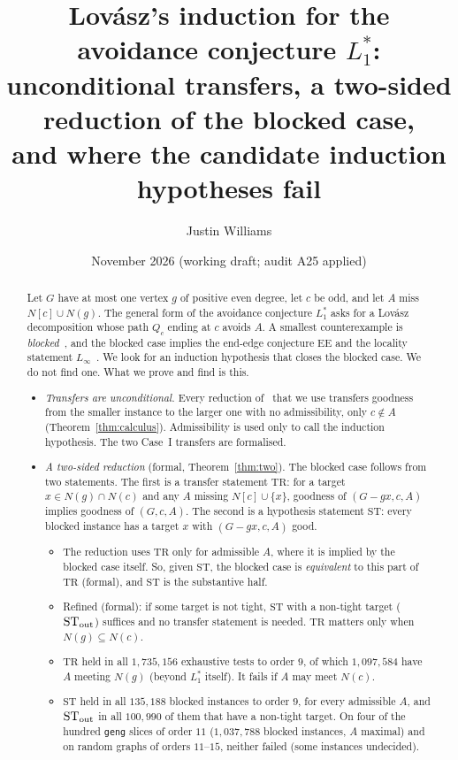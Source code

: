 \documentclass[11pt]{amsart}
\title[Lov\'asz's induction for $L_1^*$]{Lov\'asz's induction for the avoidance conjecture
$L_1^*$:\\ unconditional transfers, a two-sided reduction of the blocked case,\\ and where the
candidate induction hypotheses fail}
\author{Justin Williams}
\date{November 2026 (working draft; audit A25 applied)}
\theoremstyle{definition}
\newcommand{\TR}{\mathrm{TR}}
\newcommand{\ST}{\mathrm{ST}}
\begin{document}
\begin{abstract}
Let $G$ have at most one vertex $g$ of positive even degree, let $c$ be odd, and let $A$ miss
$N[c]\cup N(g)$. The general form of the avoidance conjecture $L_1^*$ asks for a Lov\'asz
decomposition whose path $Q_c$ ending at $c$ avoids $A$. A smallest counterexample is
\emph{blocked}~\cite{L1S}, and the blocked case implies the end-edge conjecture EE and the locality
statement $L_\infty$~\cite{L1S,TF}. We look for an induction hypothesis that closes the blocked
case. We do not find one. What we prove and find is this.

\begin{itemize}
\item \emph{Transfers are unconditional.} Every reduction of~\cite{L1S} that we use transfers goodness
from the smaller instance to the larger one with no admissibility, only $c\notin A$
(Theorem~\ref{thm:calculus}). Admissibility is used only to call the induction hypothesis. The two
Case~I transfers are formalised.
\item \emph{A two-sided reduction} (formal, Theorem~\ref{thm:two}). The blocked case follows from two
statements. The first is a transfer statement $\TR$: for a target $x\in N(g)\cap N(c)$ and any $A$
missing $N[c]\cup\{x\}$, goodness of $(G-gx,c,A)$ implies goodness of $(G,c,A)$. The second is a
hypothesis statement $\ST$: every blocked instance has a target $x$ with $(G-gx,c,A)$ good.
\begin{itemize}
\item The reduction uses $\TR$ only for admissible $A$, where it is implied by the blocked case
itself. So, given $\ST$, the blocked case is \emph{equivalent} to this part of $\TR$ (formal), and
$\ST$ is the substantive half.
\item Refined (formal): if some target is not tight, $\ST$ with a non-tight target ($\ST_{\rm out}$)
suffices and no transfer statement is needed. $\TR$ matters only when $N(g)\subseteq N(c)$.
\item $\TR$ held in all $1{,}735{,}156$ exhaustive tests to order $9$, of which $1{,}097{,}584$ have
$A$ meeting $N(g)$ (beyond $L_1^*$ itself). It fails if $A$ may meet $N(c)$.
\item $\ST$ held in all $135{,}188$ blocked instances to order $9$, for every admissible $A$, and
$\ST_{\rm out}$ in all $100{,}990$ of them that have a non-tight target. On four of the hundred
\texttt{geng} slices of order $11$ ($1{,}037{,}788$ blocked instances, $A$ maximal) and on random
graphs of orders $11$--$15$, neither failed (some instances undecided).

\end{itemize}
\end{itemize}
\end{abstract}
\end{document}
